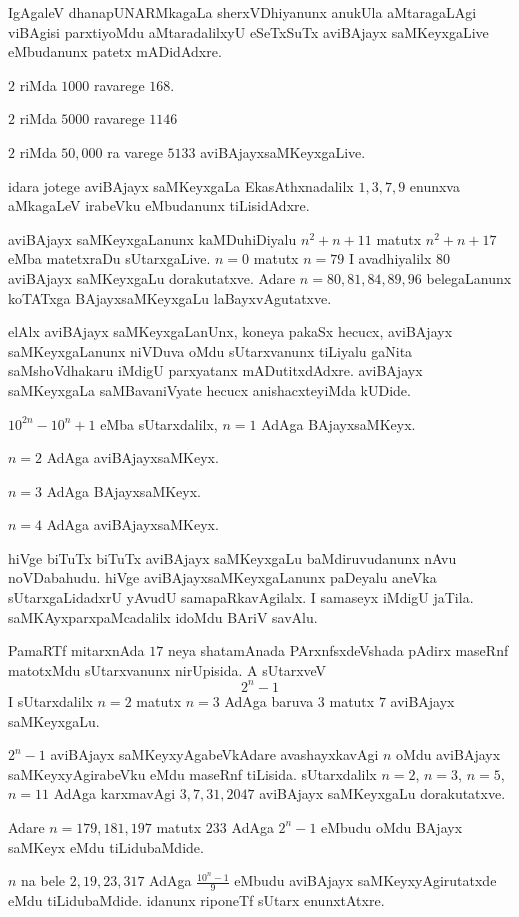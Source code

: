 IgAgaleV dhanapUNARMkagaLa sherxVDhiyanunx anukUla aMtaragaLAgi viBAgisi parxtiyoMdu aMtaradalilxyU eSeTxSuTx aviBAjayx saMKeyxgaLive eMbudanunx patetx mADidAdxre.

$2$ riMda $1000$ ravarege $168$.
 
$2$ riMda $5000$ ravarege $1146$ 

$2$ riMda $50,000$ ra varege $5133$ aviBAjayxsaMKeyxgaLive.

idara jotege aviBAjayx saMKeyxgaLa EkasAthxnadalilx $1,3,7,9$ enunxva aMkagaLeV irabeVku eMbudanunx tiLisidAdxre.

aviBAjayx saMKeyxgaLanunx kaMDuhiDiyalu $n^2+n+11$ matutx $n^2+n+17$ eMba matetxraDu sUtarxgaLive. $n=0$ matutx $n=79$ I avadhiyalilx $80$ aviBAjayx saMKeyxgaLu dorakutatxve. Adare $n=80,81,84,89,96$ belegaLanunx koTATxga BAjayxsaMKeyxgaLu laBayxvAgutatxve.

elAlx aviBAjayx saMKeyxgaLanUnx, koneya pakaSx hecucx, aviBAjayx saMKeyxgaLanunx niVDuva oMdu sUtarxvanunx tiLiyalu gaNita saMshoVdhakaru iMdigU parxyatanx mADutitxdAdxre. aviBAjayx saMKeyxgaLa saMBavaniVyate hecucx anishacxteyiMda kUDide.

$10^{2n}-10^n+1$ eMba sUtarxdalilx, $n=1$ AdAga BAjayxsaMKeyx. 

$n=2$ AdAga aviBAjayxsaMKeyx.

$n=3$ AdAga BAjayxsaMKeyx.

$n=4$ AdAga aviBAjayxsaMKeyx.

hiVge biTuTx biTuTx aviBAjayx saMKeyxgaLu baMdiruvudanunx nAvu noVDabahudu. hiVge aviBAjayxsaMKeyxgaLanunx paDeyalu aneVka sUtarxgaLidadxrU yAvudU samapaRka\-vAgilalx. I samaseyx iMdigU jaTila. saMKAyxparxpaMcadalilx idoMdu BAriV savAlu.

PamaRTf mitarxnAda $17$ neya shatamAnada PArxnfsxdeVshada pAdirx maseRnf matotxMdu sUtarxvanunx nirUpisida. A sUtarxveV 
$$
2^n-1
$$
I sUtarxdalilx $n=2$ matutx $n=3$ AdAga baruva $3$ matutx $7$ aviBAjayx saMKeyxgaLu.

$2^n-1$ aviBAjayx saMKeyxyAgabeVkAdare avashayxkavAgi $n$ oMdu aviBAjayx saMKeyxyAgirabeVku eMdu maseRnf tiLisida. sUtarxdalilx $n=2$, $n=3$, $n=5$, $n=11$ AdAga karxmavAgi $3,7,31,2047$ aviBAjayx saMKeyxgaLu dorakutatxve.

Adare $n= 179,181,197$ matutx $233$ AdAga $2^{n}-1$ eMbudu oMdu BAjayx saMKeyx eMdu tiLidubaMdide.

$n$ na bele $2,19,23,317$ AdAga $\frac{10^n-1}{9}$ eMbudu aviBAjayx saMKeyxyAgiru\-tatxde eMdu tiLidubaMdide. idanunx riponeTf sUtarx enunxtAtxre.

